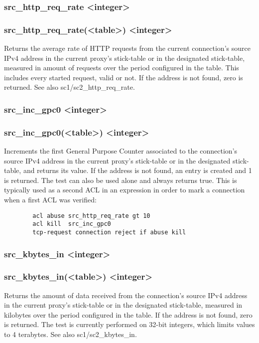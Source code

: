 \subsubsection[src\_http\_req\_rate]{src\_http\_req\_rate <integer>}
\subsubsection*{src\_http\_req\_rate(<table>) <integer>}
  Returns the average rate of HTTP requests from the current connection's
  source IPv4 address in the current proxy's stick-table or in the designated
  stick-table, measured in amount of requests over the period configured in the
  table. This includes every started request, valid or not. If the address is
  not found, zero is returned. See also sc1/sc2\_http\_req\_rate.

\subsubsection[src\_inc\_gpc0]{src\_inc\_gpc0 <integer>}
\subsubsection{src\_inc\_gpc0(<table>) <integer>}
  Increments the first General Purpose Counter associated to the connection's
  source IPv4 address in the current proxy's stick-table or in the designated
  stick-table, and returns its value. If the address is not found, an entry is
  created and 1 is returned. The test can also be used alone and always returns
  true. This is typically used as a second ACL in an expression in order to
  mark a connection when a first ACL was verified:
  \begin{verbatim}
        acl abuse src_http_req_rate gt 10
        acl kill  src_inc_gpc0
        tcp-request connection reject if abuse kill
  \end{verbatim}

\subsubsection[src\_kbytes\_in]{src\_kbytes\_in <integer>}
\subsubsection*{src\_kbytes\_in(<table>) <integer>}
  Returns the amount of data received from the connection's source IPv4 address
  in the current proxy's stick-table or in the designated stick-table, measured
  in kilobytes over the period configured in the table. If the address is not
  found, zero is returned. The test is currently performed on 32-bit integers,
  which limits values to 4 terabytes. See also sc1/sc2\_kbytes\_in.

